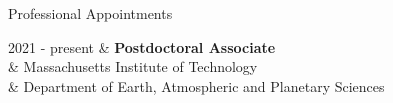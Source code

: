 \begin{rSection}{Professional Appointments}
	\begin{timeline}
		2021 - present & \textbf{Postdoctoral Associate}\\
			& Massachusetts Institute of Technology\\
			& Department of Earth, Atmospheric and Planetary Sciences
	\end{timeline}
\end{rSection}